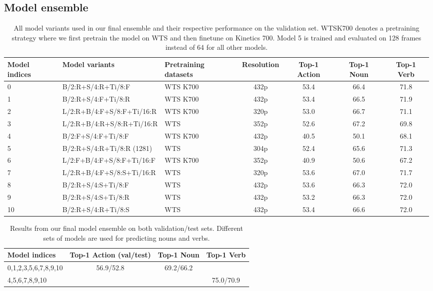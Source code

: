 \subsection{Model ensemble}
\label{sec:ensemble}
\begin{table*} 
	\centering
	\scriptsize{
\begin{tabular}{  l l  l c c  c c }
    \toprule
    Model indices & Model variants & Pretraining datasets & Resolution & Top-1 Action & Top-1 Noun & Top-1 Verb \\
    \midrule
    0 & B/2:R+S/4:R+Ti/8:F & WTS  K700 & 432p & 53.4 & 66.4 & 71.8 \\
    1 & B/2:R+S/4:F+Ti/8:R & WTS  K700 & 432p & 53.4 & 66.5 & 71.9 \\
    2 & L/2:R+B/4:F+S/8:F+Ti/16:R & WTS  K700 & 320p & 53.0 & 66.7 & 71.1 \\
    3 & L/2:R+B/4:R+S/8:R+Ti/16:R & WTS & 352p & 52.6 & 67.2 & 69.8 \\
    4 & B/2:F+S/4:F+Ti/8:F & WTS  K700 & 432p & 40.5 & 50.1 & 68.1 \\
    5 & B/2:R+S/4:R+Ti/8:R (1281) & WTS & 304p & 52.4 & 65.6 & 71.3 \\
    6 & L/2:F+B/4:F+S/8:F+Ti/16:F & WTS  K700 & 352p & 40.9 & 50.6 & 67.2 \\
    7 & L/2:R+B/4:F+S/8:S+Ti/16:R & WTS & 320p & 53.6 & 67.0 & 71.7 \\
    8 & B/2:R+S/4:S+Ti/8:F & WTS & 432p & 53.6 & 66.3 & 72.0 \\
    9 & B/2:R+S/4:S+Ti/8:R & WTS & 432p & 53.2 & 66.3 & 72.0 \\
    10 & B/2:R+S/4:R+Ti/8:S & WTS & 432p & 53.4 & 66.6 & 72.0 \\
    \bottomrule
   \end{tabular}
   }
	\caption{All model variants used in our final ensemble and their respective performance on the validation set. WTSK700 denotes a pretraining strategy where we first pretrain the model on WTS and then finetune on Kinetics 700. Model 5 is trained and evaluated on 128 frames instead of 64 for all other models.}
\label{tab:all_models}
\end{table*}
 \begin{table} 
	\centering
	\scriptsize{
\begin{tabular}{  l  c  c  c }
    \toprule
    Model indices & Top-1 Action (val/test) & Top-1 Noun & Top-1 Verb \\
    \midrule
    0,1,2,3,5,6,7,8,9,10 & \multirow{2}{*}{56.9/52.8} & 69.2/66.2 &  \\
    4,5,6,7,8,9,10 & &  & 75.0/70.9 \\
    \bottomrule
   \end{tabular}
   }
	\caption{Results from our final model ensemble on both validation/test sets. Different sets of models are used for predicting nouns and verbs.}
\label{tab:ensemble}
\end{table}
